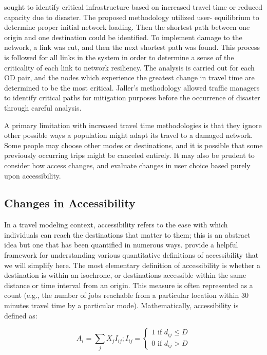 \citet{jaller2015} sought to identify critical infrastructure based on
increased travel time or
reduced capacity due to disaster. The proposed methodology utilized user-
equilibrium to determine
proper initial network loading. Then the shortest path between one origin
and one destination
could be identified. To implement damage to the network, a link was cut, and
then the next shortest
path was found. This process is followed for all links in the system in
order to determine a sense
of the criticality of each link to network resiliency. The analysis is
carried out for each OD
pair, and the nodes which experience the greatest change in travel time are determined to
be the most critical.
Jaller’s methodology allowed traffic managers to identify critical paths
for mitigation purposes
before the occurrence of disaster through careful analysis.

A primary limitation with increased travel time methodologies is that they
ignore other possible ways a population might adapt its travel to a
damaged
network. Some people may choose other modes or destinations, and it is
possible
that some previously occurring trips might be canceled entirely. It may also be
prudent to consider how access changes, and evaluate changes in user choice
based purely upon accessibility.

\subsection{Changes in Accessibility}
\label{sec:cacc}
In a travel modeling context, {accessibility} refers to the ease
with which
individuals can reach the destinations that matter to them; this is an
abstract
idea but one that has been quantified in numerous ways. \citet{dong2006}
provide a
helpful framework for understanding various quantitative definitions of
accessibility that we will simplify here. The most elementary definition of
accessibility is whether a destination is within an isochrone, or
destinations accessible within the same distance or time interval from an origin.
This measure is often represented as a count (e.g., the number
of jobs
reachable from a particular location within 30 minutes travel time by a
particular mode). Mathematically, accessibility is defined as:

\begin{equation}
A_i = \sum_{j} X_j I_{ij}; I_{ij} = \begin{cases}  1 \text{ if } d_{ij}
\leq D\\
0 \text{ if } d_{ij} > D \end{cases}
	\label{eqn:isochrone}
\end{equation}

